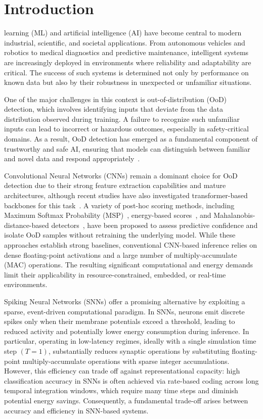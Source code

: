 \documentclass{ieeeaccess}
\begin{document}
\section{Introduction}
\label{sec:introduction}

 learning (ML) and artificial intelligence (AI) have become central to modern industrial, scientific, and societal applications. From autonomous vehicles and robotics to medical diagnostics and predictive maintenance, intelligent systems are increasingly deployed in environments where reliability and adaptability are critical. The success of such systems is determined not only by performance on known data but also by their robustness in unexpected or unfamiliar situations.

One of the major challenges in this context is out-of-distribution (OoD) detection, which involves identifying inputs that deviate from the data distribution observed during training. A failure to recognize such unfamiliar inputs can lead to incorrect or hazardous outcomes, especially in safety-critical domains. As a result, OoD detection has emerged as a fundamental component of trustworthy and safe AI, ensuring that models can distinguish between familiar and novel data and respond appropriately~\cite{hendrycks2017baseline, liu2020energy, lee2018simple}.

Convolutional Neural Networks (CNNs) remain a dominant choice for OoD detection due to their strong feature extraction capabilities and mature architectures, although recent studies have also investigated transformer-based backbones for this task~\cite{ming2022delving}. A variety of post-hoc scoring methods, including Maximum Softmax Probability (MSP)~\cite{hendrycks2017baseline}, energy-based scores~\cite{liu2020energy}, and Mahalanobis-distance-based detectors~\cite{lee2018simple}, have been proposed to assess predictive confidence and isolate OoD samples without retraining the underlying model. While these approaches establish strong baselines, conventional CNN-based inference relies on dense floating-point activations and a large number of multiply-accumulate (MAC) operations. The resulting significant computational and energy demands limit their applicability in resource-constrained, embedded, or real-time environments.

Spiking Neural Networks (SNNs) offer a promising alternative by exploiting a sparse, event-driven computational paradigm. In SNNs, neurons emit discrete spikes only when their membrane potentials exceed a threshold, leading to reduced activity and potentially lower energy consumption during inference. In particular, operating in low-latency regimes, ideally with a single simulation time step $(T=1)$, substantially reduces synaptic operations by substituting floating-point multiply-accumulate operations with sparse integer accumulations. However, this efficiency can trade off against representational capacity: high classification accuracy in SNNs is often achieved via rate-based coding across long temporal integration windows, which require many time steps and diminish potential energy savings. Consequently, a fundamental trade-off arises between accuracy and efficiency in SNN-based systems.
\end{document}
